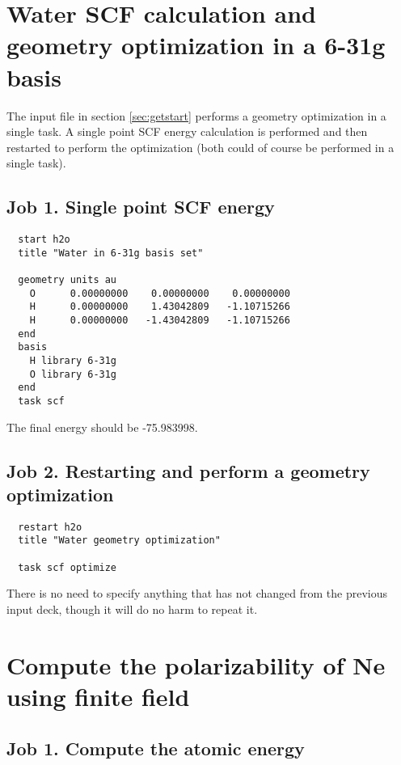 %
%
\label{sec:sample}
\section{Water SCF calculation and geometry optimization in a 6-31g basis}
\label{sec:sample1}

The input file in section \ref{sec:getstart} performs a geometry optimization
in a single task. A single point SCF energy calculation is performed and then
restarted to perform the optimization (both could of course be
performed in a single task).

\subsection{Job 1.  Single point SCF energy}

\begin{verbatim}
  start h2o
  title "Water in 6-31g basis set"

  geometry units au
    O      0.00000000    0.00000000    0.00000000
    H      0.00000000    1.43042809   -1.10715266
    H      0.00000000   -1.43042809   -1.10715266
  end
  basis
    H library 6-31g
    O library 6-31g
  end
  task scf
\end{verbatim}

The final energy should be -75.983998.

\subsection{Job 2. Restarting and perform a geometry optimization}

\begin{verbatim}
  restart h2o
  title "Water geometry optimization"

  task scf optimize
\end{verbatim}

There is no need to specify anything that has not changed from the
previous input deck, though it will do no harm to repeat it.

\section{Compute the polarizability of Ne using finite field}
\label{sec:sample2}

\subsection{Job 1. Compute the atomic energy}

